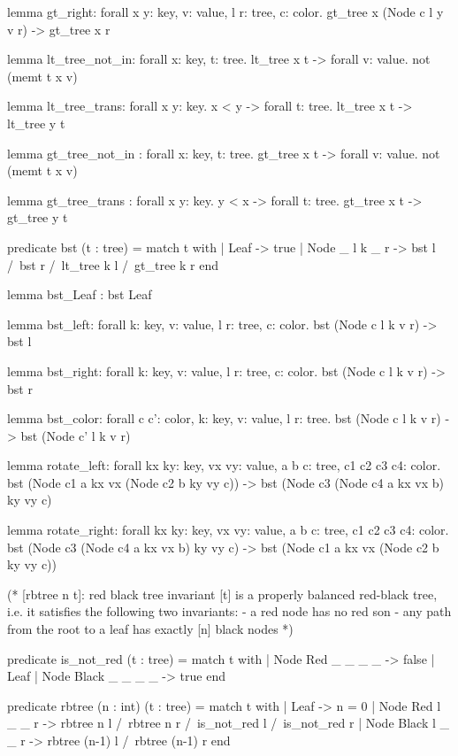 \begin{whylang}
  lemma gt_right:
    forall x y: key, v: value, l r: tree, c: color.
    gt_tree x (Node c l y v r) -> gt_tree x r

  lemma lt_tree_not_in:
    forall x: key, t: tree. lt_tree x t -> forall v: value. not (memt t x v)

  lemma lt_tree_trans:
    forall x y: key. x < y -> forall t: tree. lt_tree x t -> lt_tree y t

  lemma gt_tree_not_in :
    forall x: key, t: tree. gt_tree x t -> forall v: value. not (memt t x v)

  lemma gt_tree_trans :
    forall x y: key. y < x -> forall t: tree. gt_tree x t -> gt_tree y t

  predicate bst (t : tree) =
    match t with
    | Leaf -> true
    | Node _ l k _ r -> bst l /\ bst r /\ lt_tree k l /\ gt_tree k r
    end

  lemma bst_Leaf : bst Leaf

  lemma bst_left:
    forall k: key, v: value, l r: tree, c: color. bst (Node c l k v r) -> bst l

  lemma bst_right:
    forall k: key, v: value, l r: tree, c: color. bst (Node c l k v r) -> bst r

  lemma bst_color:
    forall c c': color, k: key, v: value, l r: tree.
    bst (Node c l k v r) -> bst (Node c' l k v r)

  lemma rotate_left:
    forall kx ky: key, vx vy: value, a b c: tree, c1 c2 c3 c4: color.
    bst (Node c1 a kx vx (Node c2 b ky vy c)) ->
    bst (Node c3 (Node c4 a kx vx b) ky vy c)

  lemma rotate_right:
    forall kx ky: key, vx vy: value, a b c: tree, c1 c2 c3 c4: color.
    bst (Node c3 (Node c4 a kx vx b) ky vy c) ->
    bst (Node c1 a kx vx (Node c2 b ky vy c))

  (* [rbtree n t]: red black tree invariant
     [t] is a properly balanced red-black tree, i.e. it
      satisfies the following two invariants:
      - a red node has no red son
      - any path from the root to a leaf has exactly [n] black nodes
   *)

  predicate is_not_red (t : tree) =
    match t with
    | Node Red _ _ _ _ -> false
    | Leaf | Node Black _ _ _ _ -> true
    end

  predicate rbtree (n : int) (t : tree) =
    match t with
    | Leaf ->
        n = 0
    | Node Red   l _ _ r ->
        rbtree n l /\ rbtree n r /\ is_not_red l /\ is_not_red r
    | Node Black l _ _ r ->
        rbtree (n-1) l /\ rbtree (n-1) r
    end


\end{whylang}
